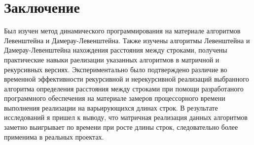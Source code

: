 \documentclass[12pt]{report}
\begin{document}
\chapter*{Заключение}
Был изучен метод динамического программирования на материале алгоритмов Левенштейна и Дамерау-Левенштейна.
Также изучены алгоритмы Левенштейна и Дамерау-Левенштейна нахождения расстояния между строками, получены практические навыки раелизации указанных алгоритмов
в матричной  и рекурсивных версиях. 
Экспериментально было подтверждено различие во временной эффективности рекурсивной и нерекурсивной реализаций выбранного алгоритма определения 
расстояния между строками при помощи разработаного программного обеспечения на материале замеров процессорного времени выполнения 
реализации на варьирующихся длинах строк. 
В результате исследований я пришел к выводу, что матричная реализация данных алгоритмов заметно выигрывает по времени при росте 
длины строк, следовательно более применима в реальных проектах.
\end{document}
